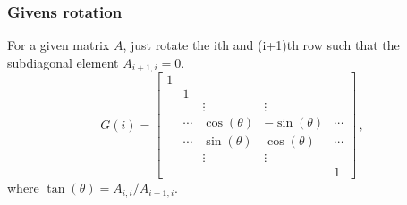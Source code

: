 \begin{frame}
  \frametitle{Givens rotation}
  For a given matrix $A$, just rotate the ith and (i+1)th 
  row such that the subdiagonal element $A_{i+1,i}=0$.
  \[
  G(i) = 
  \begin{bmatrix}
    1 & & & & \\
    & 1 & & & \\
    & & \vdots & \vdots & \\
    & \cdots & \cos(\theta) & -\sin(\theta) & \cdots \\
    & \cdots & \sin(\theta) & \cos(\theta) & \cdots \\
    & & \vdots & \vdots & \\
    & & & & 1 
  \end{bmatrix}
  \,,
  \]
  where $\tan(\theta)=A_{i,i}/A_{i+1,i}$. 
\end{frame}


